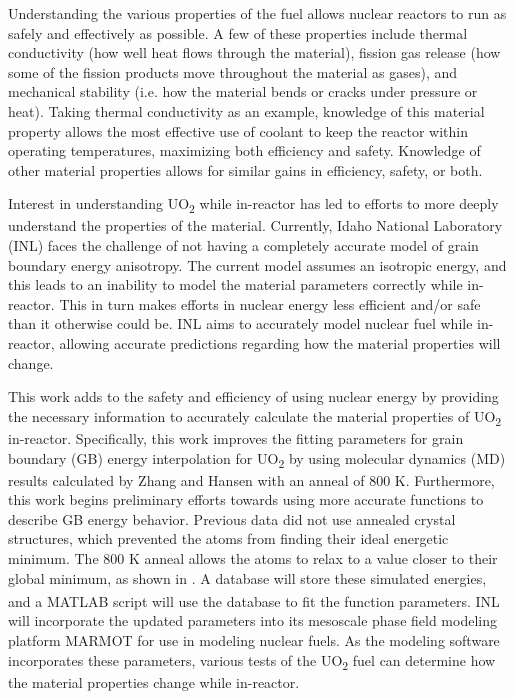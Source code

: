 \documentclass[twoside,senior]{BYUPhys}
\begin{document}
Understanding the various properties of the fuel allows nuclear reactors to run as safely and effectively as possible.  A few of these properties include thermal conductivity (how well heat flows through the material), fission gas release (how some of the fission products move throughout the material as gases), and mechanical stability (i.e. how the material bends or cracks under pressure or heat).  Taking thermal conductivity as an example, knowledge of this material property allows the most effective use of coolant to keep the reactor within operating temperatures, maximizing both efficiency and safety.  Knowledge of other material properties allows for similar gains in efficiency, safety, or both.

Interest in understanding UO\textsubscript{2} while in-reactor has led to efforts to more deeply understand the properties of the material.  Currently, Idaho National Laboratory (INL) faces the challenge of not having a completely accurate model of grain boundary energy anisotropy.  The current model assumes an isotropic energy, and this leads to an inability to model the material parameters correctly while in-reactor.  This in turn makes efforts in nuclear energy less efficient and/or safe than it otherwise could be.  INL aims to accurately model nuclear fuel while in-reactor, allowing accurate predictions regarding how the material properties will change.

This work adds to the safety and efficiency of using nuclear energy by providing the necessary information to accurately calculate the material properties of UO\textsubscript{2} in-reactor.  Specifically, this work improves the fitting parameters for grain boundary (GB) energy interpolation for UO\textsubscript{2} by using molecular dynamics (MD) results calculated by Zhang\cite{zhang2016} and Hansen\cite{hansen2016} with an anneal of 800 K.  Furthermore, this work begins preliminary efforts towards using more accurate functions to describe GB energy behavior.  Previous data did not use annealed crystal structures\cite{harbison2015}, which prevented the atoms from finding their ideal energetic minimum.  The 800 K anneal allows the atoms to relax to a value closer to their global minimum, as shown in .  A database will store these simulated energies, and a MATLAB\textsuperscript{\textregistered} script will use the database to fit the function parameters.  INL will incorporate the updated parameters into its mesoscale phase field modeling platform MARMOT for use in modeling nuclear fuels.  As the modeling software incorporates these parameters, various tests of the UO\textsubscript{2} fuel can determine how the material properties change while in-reactor.
\end{document}
